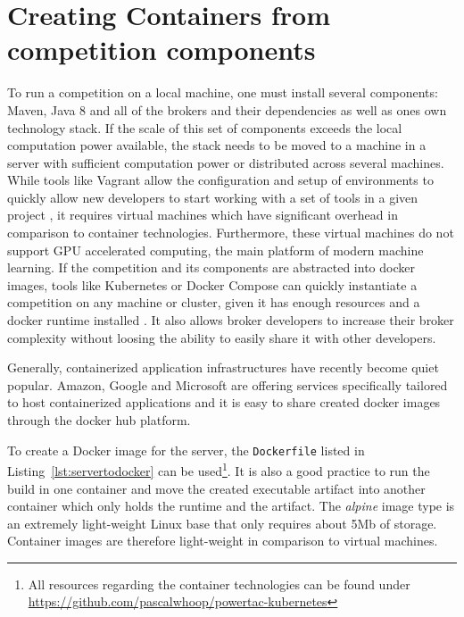 \section{Creating Containers from competition components}
\label{sec:creating_containers_from_competition_components}

To run a competition on a local machine, one must install several components: Maven, Java 8 and all of the brokers and
their dependencies as well as ones own technology stack. If the scale of this set of components exceeds the local
computation power available, the stack needs to be moved to a machine in a server with sufficient computation power or
distributed across several machines.
While tools like Vagrant allow
the configuration and setup of environments to quickly allow new developers to start working with a set of tools in a
given project \citep{vagrant} , it requires virtual machines which have significant overhead in comparison to container
technologies. Furthermore, these virtual machines do not support \ac{GPU} accelerated computing, the main platform of
modern machine learning. If the competition and its components are abstracted into docker images, tools like Kubernetes or Docker Compose
can quickly instantiate a
competition on any machine or cluster, given it has enough resources and a docker runtime installed \citep{docker}. It
also allows broker developers to increase their broker complexity without loosing the ability to easily share it with
other developers.

Generally, containerized application infrastructures have recently become quiet popular. Amazon, Google and Microsoft are offering
services specifically tailored to host containerized applications and it is easy to share created docker images
through the docker hub platform.

To create a Docker image for the server, the \texttt{Dockerfile} listed in Listing~\ref{lst:servertodocker} can be used\footnote{All resources regarding the container technologies can be found under
\url{https://github.com/pascalwhoop/powertac-kubernetes}}.
It is also a good practice to run the build in one container and move the created executable artifact into another
container which only holds the runtime and the artifact. The \emph{alpine} image type is an extremely
light-weight Linux base that only requires about 5Mb of storage. Container images are therefore light-weight in comparison
to virtual machines.

